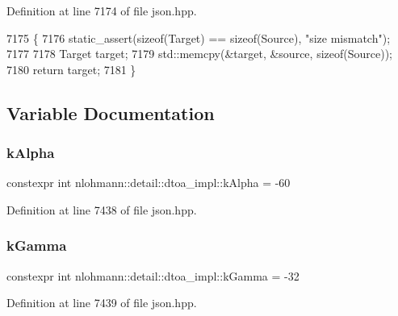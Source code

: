 Definition at line 7174 of file json.\+hpp.


\begin{DoxyCode}
7175 \{
7176     static\_assert(\textcolor{keyword}{sizeof}(Target) == \textcolor{keyword}{sizeof}(Source), \textcolor{stringliteral}{"size mismatch"});
7177 
7178     Target target;
7179     std::memcpy(&target, &source, \textcolor{keyword}{sizeof}(Source));
7180     \textcolor{keywordflow}{return} target;
7181 \}
\end{DoxyCode}


\subsection{Variable Documentation}
\mbox{\label{namespacenlohmann_1_1detail_1_1dtoa__impl_ac1ea1316de0b4a219f707c76b1db1966}} 
\subsubsection{\texorpdfstring{k\+Alpha}{kAlpha}}
{\footnotesize\ttfamily constexpr int nlohmann\+::detail\+::dtoa\+\_\+impl\+::k\+Alpha = -\/60}



Definition at line 7438 of file json.\+hpp.

\mbox{\label{namespacenlohmann_1_1detail_1_1dtoa__impl_a4a750fcc38da1ce68b7e25ab3a230e20}} 
\subsubsection{\texorpdfstring{k\+Gamma}{kGamma}}
{\footnotesize\ttfamily constexpr int nlohmann\+::detail\+::dtoa\+\_\+impl\+::k\+Gamma = -\/32}



Definition at line 7439 of file json.\+hpp.


